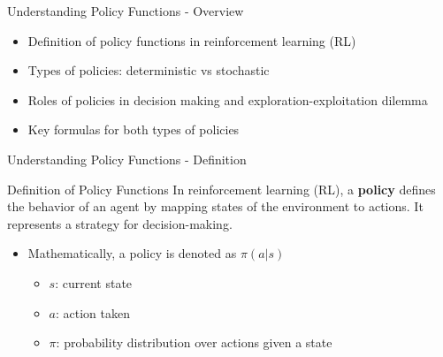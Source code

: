 \documentclass[aspectratio=169]{beamer}
\begin{document}
\begin{frame}[fragile]{Understanding Policy Functions - Overview}
    \begin{itemize}
        \item Definition of policy functions in reinforcement learning (RL)
        \item Types of policies: deterministic vs stochastic
        \item Roles of policies in decision making and exploration-exploitation dilemma
        \item Key formulas for both types of policies
    \end{itemize}
\end{frame}

\begin{frame}[fragile]{Understanding Policy Functions - Definition}
    \begin{block}{Definition of Policy Functions}
        In reinforcement learning (RL), a \textbf{policy} defines the behavior of an agent by mapping states of the environment to actions. It represents a strategy for decision-making.
    \end{block}
    
    \begin{itemize}
        \item Mathematically, a policy is denoted as \( \pi(a|s) \)
            \begin{itemize}
                \item \( s \): current state
                \item \( a \): action taken
                \item \( \pi \): probability distribution over actions given a state
            \end{itemize}
    \end{itemize}
\end{frame}
\end{document}
